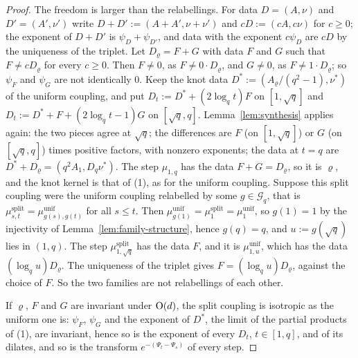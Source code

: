 \begin{proof}
The freedom is larger than the relabellings. For data $D = (A, \nu)$ and $D' = (A', \nu')$ write
$D + D' := (A + A', \nu + \nu')$ and $cD := (cA, c\nu)$ for $c \ge 0$; the exponent of $D + D'$ is
$\psi_D + \psi_{D'}$, and data with the exponent $c\psi_D$ are $cD$ by the uniqueness of the
triplet. Let $D_\varrho = F + G$ with data $F$ and $G$ such that $F \ne cD_\varrho$ for every
$c \ge 0$. Then $F \ne 0$, as $F \ne 0\cdot D_\varrho$, and $G \ne 0$, as $F \ne 1\cdot D_\varrho$; so
$\psi_F$ and $\psi_G$ are not identically $0$. Keep the knot data $D^* := (A_\varrho/(q^2 - 1),
\nu^*)$ of the uniform coupling, and put $D_t := D^* + (2\log_qt)F$ on $[1, \sqrt q]$ and
$D_t := D^* + F + (2\log_qt - 1)G$ on $[\sqrt q, q]$. Lemma~\ref{lem:synthesis} applies again: the
two pieces agree at $\sqrt q$; the differences are $F$ (on $[1, \sqrt q]$) or $G$ (on
$[\sqrt q, q]$) times positive factors, with nonzero exponents; the data at $t = q$ are
$D^* + D_\varrho = (q^2A_1, D_q\nu^*)$. The step $\mu_{1,q}$ has the data $F + G = D_\varrho$, so it is
$\varrho$, and the knot kernel is that of (1), as for the uniform coupling. Suppose this split
coupling were the uniform coupling relabelled by some $g \in \mathcal{G}_q$, that is
$\mu^{\mathrm{split}}_{s,t} = \mu^{\mathrm{unif}}_{g(s),g(t)}$ for all $s \le t$. Then
$\mu^{\mathrm{unif}}_{g(1)} = \mu^{\mathrm{split}}_1 = \mu^{\mathrm{unif}}_1$, so $g(1) = 1$ by the
injectivity of Lemma~\ref{lem:family-structure}, hence $g(q) = q$, and $u := g(\sqrt q)$ lies in
$(1, q)$. The step $\mu^{\mathrm{split}}_{1,\sqrt q}$ has the data $F$, and it is
$\mu^{\mathrm{unif}}_{1,u}$, which has the data $(\log_qu)D_\varrho$. The uniqueness of the triplet
gives $F = (\log_qu)D_\varrho$, against the choice of $F$. So the two families are not relabellings
of each other.

If $\varrho$, $F$ and $G$ are invariant under $\mathrm{O}(d)$, the split coupling is isotropic as the
uniform one is: $\psi_F$, $\psi_G$ and the exponent of $D^*$, the limit of the partial products of
(1), are invariant, hence so is the exponent of every $D_t$, $t \in [1, q]$, and of its dilates, and
so is the transform $e^{-(\Psi_t - \Psi_s)}$ of every step.


\end{proof}
